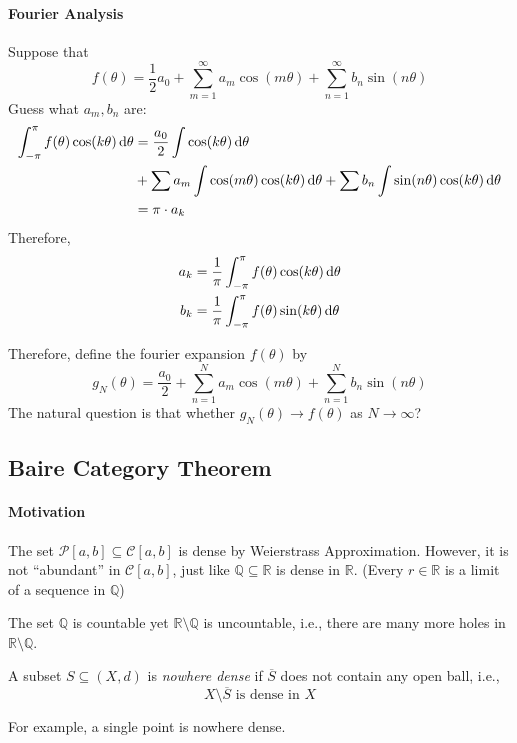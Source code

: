 \paragraph{Fourier Analysis}Suppose that
\[
f(\theta) = \frac{1}{2}a_0 + \sum_{m=1}^\infty a_m\cos(m\theta) + \sum_{n=1}^\infty b_n\sin(n\theta)
\]
Guess what $a_m,b_n$ are:
\begin{align*}
\int_{-\pi}^\pi f(\theta) \cos(k\theta)\,\mathrm{d}\theta &= \frac{a_0}{2}\int\cos(k\theta)\,\mathrm{d}\theta\\&
+
\sum a_m\int\cos(m\theta)\cos(k\theta)\,\mathrm{d}\theta
+
\sum b_n\int\sin(n\theta)\cos(k\theta)\,\mathrm{d}\theta\\
&=\pi\cdot a_k
\end{align*}
Therefore,
\begin{align*}
a_k&=\frac{1}{\pi}\int_{-\pi}^\pi f(\theta)\cos(k\theta)\,\mathrm{d}\theta\\
b_k&=\frac{1}{\pi}\int_{-\pi}^\pi f(\theta)\sin(k\theta)\,\mathrm{d}\theta
\end{align*}


Therefore, define the fourier expansion $f(\theta)$ by
\[
g_N(\theta) = \frac{a_0}{2}+\sum_{n=1}^Na_m\cos(m\theta)+\sum_{n=1}^Nb_n\sin(n\theta)
\]
The natural question is that whether $g_N(\theta)\to f(\theta)$ as $N\to\infty$?

\subsection{Baire Category Theorem}
\paragraph{Motivation}
The set $\mathcal{P}[a,b]\subseteq\mathcal{C}[a,b]$ is dense by Weierstrass Approximation.
However, it is not ``abundant'' in $\mathcal{C}[a,b]$, just like $\mathbb{Q}\subseteq\mathbb{R}$ is dense in $\mathbb{R}$.
(Every $r\in\mathbb{R}$ is a limit of a sequence in $\mathbb{Q}$)

The set $\mathbb{Q}$ is countable yet $\mathbb{R}\setminus\mathbb{Q}$ is uncountable, i.e., there are many more holes in $\mathbb{R}\setminus\mathbb{Q}$.

\begin{definition}
A subset $S\subseteq(X,d)$ is \emph{nowhere dense} if $\overline{S}$ does not contain any open ball, i.e., 
\[
\text{$X\setminus\overline{S}$ is dense in $X$}
\]
\end{definition}
For example, a single point is nowhere dense.

